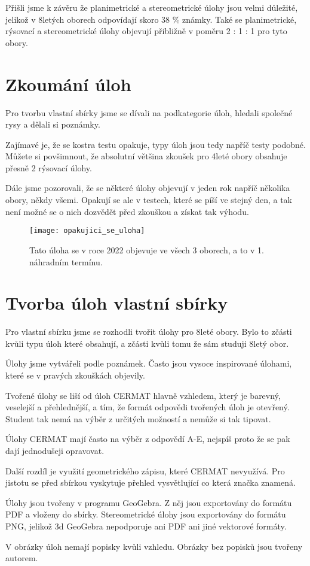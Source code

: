 Přišli jsme k závěru že planimetrické a stereometrické úlohy jsou velmi důležité, jelikož v 8letých oborech odpovídají skoro 38 \% známky. Také se planimetrické, rýsovací a stereometrické úlohy objevují přibližně v poměru 2 : 1 : 1 pro tyto obory.




\section{Zkoumání úloh}

Pro tvorbu vlastní sbírky jsme se dívali na podkategorie úloh, hledali společné rysy a dělali si poznámky.

Zajímavé je, že se kostra testu opakuje, typy úloh jsou tedy napříč testy podobné. Můžete si povšimnout, že absolutní většina zkoušek pro 4leté obory obsahuje přesně 2 rýsovací úlohy.

Dále jsme pozorovali, že se některé úlohy objevují v jeden rok napříč několika obory, někdy všemi. Opakují se ale v testech, které se píší ve stejný den, a tak není možné se o nich dozvědět před zkouškou a získat tak výhodu.


\begin{figure}[h]
    \caption{Tato úloha se v roce 2022 objevuje ve všech 3 oborech, a to v 1. náhradním termínu.}
    \centering
    \texttt{[image: opakujici\_se\_uloha]}
\end{figure}


\section{Tvorba úloh vlastní sbírky}

Pro vlastní sbírku jsme se rozhodli tvořit úlohy pro 8leté obory. Bylo to zčásti kvůli typu úloh které obsahují, a zčásti kvůli tomu že sám studuji 8letý obor.

Úlohy jsme vytvářeli podle poznámek. Často jsou vysoce inspirované úlohami, které se v pravých zkouškách objevily.

Tvořené úlohy se liší od úloh CERMAT hlavně vzhledem, který je barevný, veselejší a přehlednější, a tím, že formát odpovědi tvořených úloh je otevřený. Student tak nemá na výběr z určitých možností a nemůže si tak tipovat.

Úlohy CERMAT mají často na výběr z odpovědí A-E, nejspíš proto že se pak dají jednodušeji opravovat.

Další rozdíl je využití geometrického zápisu, které CERMAT nevyužívá. Pro jistotu se před sbírkou vyskytuje přehled vysvětlující co která značka znamená.

Úlohy jsou tvořeny v programu GeoGebra. Z něj jsou exportovány do formátu PDF a vloženy do sbírky. Stereometrické úlohy jsou exportovány do formátu PNG, jelikož 3d GeoGebra nepodporuje ani PDF ani jiné vektorové formáty.

V obrázky úloh nemají popisky kvůli vzhledu. Obrázky bez popisků jsou tvořeny autorem.
